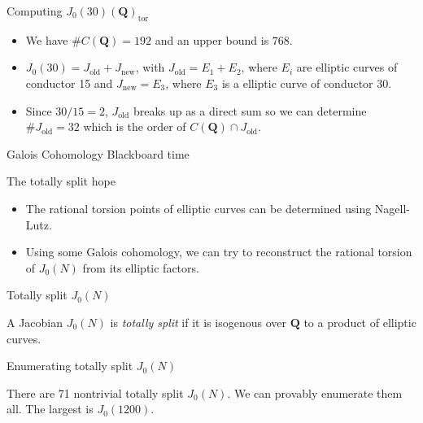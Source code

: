 \documentclass{beamer}
\newcommand{\QQ}{\mathbf{Q}}
\newcommand{\tor}{\mathrm{tor}}
\newcommand{\old}{\mathrm{old}}
\newcommand{\new}{\mathrm{new}}
\begin{document}
\begin{frame}{Computing $J_0(30)(\QQ)_\tor$}
    \begin{itemize}
        \item
            We have $\# C(\QQ) = 192$ and an upper bound is $768$.
        \item
            $J_0(30)=J_\old+J_\new$, with $J_\old=E_1+E_2$, where $E_i$ are
            elliptic curves of conductor 15 and $J_\new=E_3$, where $E_3$ is a
            elliptic curve of conductor 30.
        \item
            Since $30/15=2$, $J_\old$ breaks up as a direct sum so we can
            determine $\# J_\old  = 32$ which is the order of $C(\QQ)\cap
            J_\old$.
    \end{itemize}
\end{frame}

\begin{frame}[standout]{Galois Cohomology}
    \Huge{Blackboard time}
\end{frame}

\begin{frame}{The totally split hope}
    \begin{itemize}
        \item 
            The rational torsion points of elliptic curves can be determined
            using Nagell-Lutz.
        \item
            Using some Galois cohomology, we can try to reconstruct the
            rational torsion of $J_0(N)$ from its elliptic factors.
    \end{itemize}
\end{frame}


\begin{frame}{Totally split $J_0(N)$}
    \begin{definition}
        A Jacobian $J_0(N)$ is \emph{totally split} if it is isogenous over
        $\QQ$ to a product of elliptic curves.
    \end{definition}
\end{frame}

\begin{frame}{Enumerating totally split $J_0(N)$}
    \begin{theorem}[L.]
        There are 71 nontrivial totally split $J_0(N)$. We can provably
        enumerate them all. The largest is $J_0(1200)$.
    \end{theorem}
\end{frame}
\end{document}
